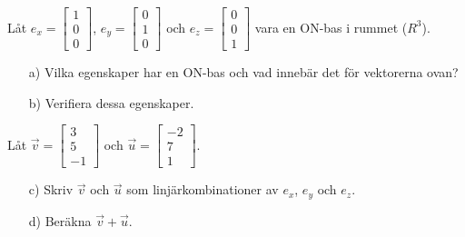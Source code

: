 Låt $e_x = \begin{bmatrix} 1 \\ 0 \\ 0 \end{bmatrix}$, $e_y = \begin{bmatrix} 0 \\ 1 \\ 0 \end{bmatrix}$ och $e_z = \begin{bmatrix} 0 \\ 0 \\ 1 \end{bmatrix}$ vara en ON-bas i rummet ($R^3$).
\begin{itemize}
\item[a) ] Vilka egenskaper har en ON-bas och vad innebär det för vektorerna ovan?
\item[b) ] Verifiera dessa egenskaper.
\end{itemize}

Låt $\vec{v} = \begin{bmatrix} 3 \\ 5 \\ -1 \end{bmatrix}$ och $\vec{u} = \begin{bmatrix} -2 \\ 7 \\ 1 \end{bmatrix}$. 
\begin{itemize} 
\item[c) ] Skriv $\vec{v}$ och $\vec{u}$ som linjärkombinationer av $e_x$, $e_y$ och $e_z$.
\item[d) ] Beräkna $\vec{v} + \vec{u}$.
\end{itemize}
